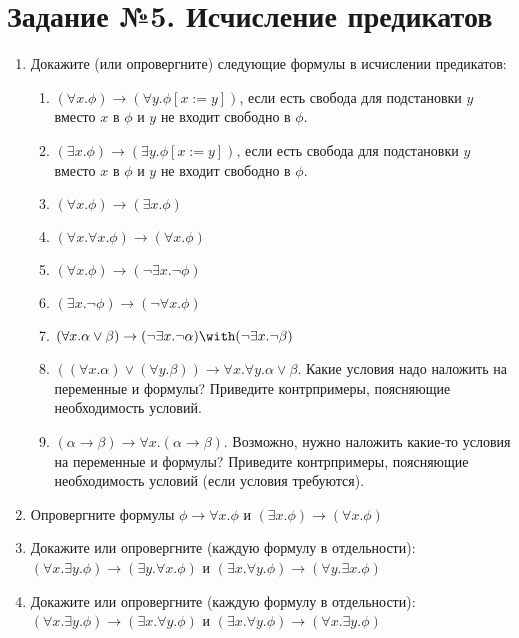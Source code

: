 \documentclass[10pt,a4paper,oneside]{article}
\begin{document}
\section*{Задание №5. Исчисление предикатов}

\begin{enumerate}
\item Докажите (или опровергните) следующие формулы в исчислении предикатов:
\begin{enumerate}
\item $(\forall x.\phi)\rightarrow (\forall y.\phi[x := y])$, если есть свобода для подстановки $y$ вместо $x$ в $\phi$ и $y$ не входит свободно в $\phi$.
\item $(\exists x.\phi)\rightarrow (\exists y.\phi[x := y])$, если есть свобода для подстановки $y$ вместо $x$ в $\phi$ и $y$ не входит свободно в $\phi$.
\item $(\forall x.\phi)\rightarrow (\exists x.\phi)$
\item $(\forall x.\forall x.\phi) \rightarrow (\forall x.\phi)$
\item $(\forall x.\phi) \rightarrow (\neg \exists x.\neg \phi)$ 
\item $(\exists x.\neg\phi) \rightarrow (\neg \forall x.\phi)$
\item $(\forall x.\alpha\vee\beta) \rightarrow (\neg \exists x.\neg \alpha) \with (\neg \exists x.\neg\beta)$
\item $((\forall x.\alpha) \vee (\forall y.\beta)) \rightarrow \forall x.\forall y.\alpha\vee\beta$. Какие условия
надо наложить на переменные и формулы? Приведите контрпримеры, поясняющие необходимость условий.
\item $(\alpha\rightarrow\beta) \rightarrow \forall x.(\alpha\rightarrow\beta)$. Возможно, нужно наложить
какие-то условия на переменные и формулы? Приведите контрпримеры, поясняющие необходимость условий (если 
условия требуются).
\end{enumerate}

\item Опровергните формулы $\phi\rightarrow\forall x.\phi$ и $(\exists x.\phi)\rightarrow (\forall x.\phi)$

\item Докажите или опровергните (каждую формулу в отдельности): $(\forall x.\exists y.\phi) \rightarrow (\exists y.\forall x.\phi)$ и
$(\exists x.\forall y.\phi) \rightarrow (\forall y.\exists x.\phi)$
\item Докажите или опровергните (каждую формулу в отдельности): $(\forall x.\exists y.\phi) \rightarrow (\exists x.\forall y.\phi)$ и
$(\exists x.\forall y.\phi) \rightarrow (\forall x.\exists y.\phi)$


\end{enumerate}
\end{document}
